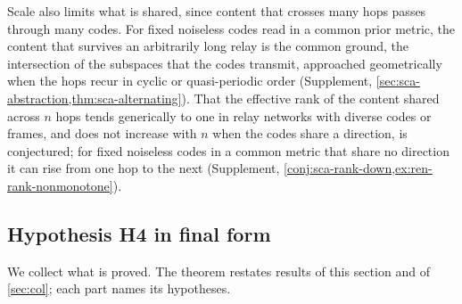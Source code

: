 Scale also limits what is shared, since content that crosses many hops passes through many codes. For fixed noiseless codes read in a common prior metric, the content that survives an arbitrarily long relay is the common ground, the intersection of the subspaces that the codes transmit, approached geometrically when the hops recur in cyclic or quasi-periodic order (Supplement, \cref{sec:sca-abstraction,thm:sca-alternating}). That the effective rank of the content shared across $n$ hops tends generically to one in relay networks with diverse codes or frames, and does not increase with $n$ when the codes share a direction, is conjectured; for fixed noiseless codes in a common metric that share no direction it can rise from one hop to the next (Supplement, \cref{conj:sca-rank-down,ex:ren-rank-nonmonotone}).

\subsection{Hypothesis H4 in final form}\label{sec:sca-h4}

We collect what is proved. The theorem restates results of this section and of \cref{sec:col}; each part names its hypotheses.

